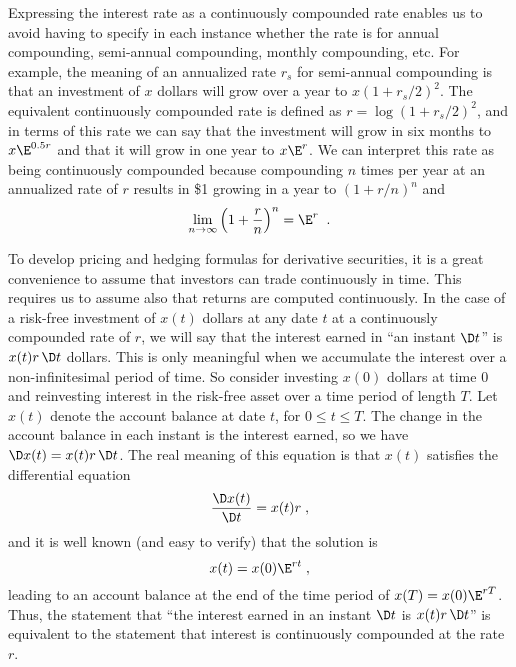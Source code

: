 Expressing the interest rate as a continuously compounded rate enables us to avoid having to specify in each instance whether the rate is for annual compounding, semi-annual compounding, monthly compounding, etc.  For example, the meaning of an annualized rate $r_s$ for semi-annual compounding is that an investment of $x$ dollars will grow over a year to $x(1+r_s/2)^2$.  The equivalent continuously compounded rate is defined as $r = \log (1+r_s/2)^2$, and in terms of this rate we can say that the investment will grow in six months to $x\E^{0.5 r}$ and that it will grow in one year to $x\E^r$.  We can interpret this rate as being continuously compounded because compounding $n$ times per year at an annualized rate of $r$ results in \$1 growing in a year to $(1+r/n)^n$ and
$$\lim_{n \rightarrow \infty} \left(1+\frac{r}{n}\right)^n = \E^r\;\;.$$

To develop pricing and hedging formulas for derivative securities, it is a great convenience to assume that investors can trade continuously in time.  This requires us to assume also that returns are computed continuously.  In the case of a risk-free investment of $x(t)$ dollars at any date $t$ at a continuously compounded rate of $r$, we will say that the interest earned in ``an instant $\D t$'' is $x(t)r\,\D t$ dollars.  This is only meaningful when we accumulate the interest over a non-infinitesimal period of time.  So consider investing $x(0)$ dollars at time 0 and reinvesting interest in the risk-free asset over a time period of length $T$.  Let $x(t)$ denote the account balance at date $t$, for $0\leq t \leq T$.  The change in the account balance in each instant is the interest earned, so we have
$\D x(t) = x(t)r\,\D t$.  The real meaning of this equation is that $x(t)$ satisfies the differential equation
$$\frac{\D x(t)}{\D t} = x(t)r\; ,$$
and it is well known (and easy to verify) that the solution is
$$x(t) = x(0)\E^{rt}\; ,$$
leading to an account balance at the end of the time period of $x(T) = x(0)\E^{rT}$.  Thus, the statement that ``the interest earned in an instant $\D t$ is $x(t)r\,\D t$'' is equivalent to the statement that interest is continuously compounded at the rate $r$.

